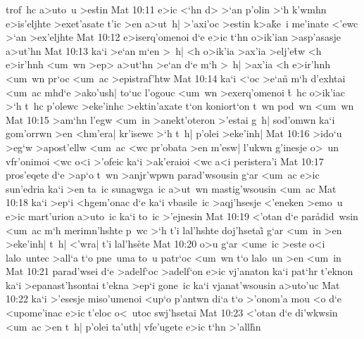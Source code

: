 trof~hc
a>uto~u
>es\r{t}in\bibvsend
{}
\vs Mat 10:11
e>ic
<`hn
d>
>`an
p'olin
>`h
k'wmhn
e>is'eljhte
>exet'asate
t'ic
>en
a>ut~h|
>'axi'oc
>estin
k>a\r{k}e~i
me'inate
<'ewc
>`an
>ex'eljhte\bibvsend
\vs Mat 10:12
e>iserq'omenoi
d`e
e>ic
t`hn
o>ik'ian
>asp'asasje
a>ut'hn\bibvsend
\vs Mat 10:13
ka`i
>e`an
m`en
>~h|
<h
o>ik'ia
>ax'ia
>elj'e\r{t}w
<h
e>ir'hnh
<um~wn
>ep>
a>ut`hn
>e`an
d`e
m`h
>~h|
>ax'ia
<h
e>ir'hnh
<um~wn
pr`oc
<um~ac
>epistraf'htw\bibvsend
\vs Mat 10:14
ka`i
<`oc
>e`a\r{n}
m`h
d'exhtai
<um~ac
mhd`e
>ako'ush|
to`uc
l'ogouc
<um~wn
>exerq'omenoi
\r{t}~hc
o>ik'iac
>`h
t~hc
p'olewc
>eke'inhc
>ektin'axate
t`on
koniort`on
t~wn
pod~wn
<um~wn\bibvsend
\vs Mat 10:15
>am`hn
l'egw
<um~in
>anekt'oteron
>'estai
g~h|
sod'omwn
ka`i
gom'orrwn
>en
<hm'era|
kr'isewc
>`h
t~h|
p'olei
>eke'inh|\bibvsend
\vs Mat 10:16
>ido`u
>eg`w
>apost'ellw
<um~ac
<wc
pr'obata
>en
m'esw|
l'ukwn
g'inesje
o>~un
vfr'onimoi
<wc
o<i
>'ofeic
ka`i
>ak'eraioi
<wc
a<i
peristera'i\bibvsend
\vs Mat 10:17
pros'eqete
d`e
>ap`o
t~wn
>anjr'wpwn
parad'wsousin
g`ar
<um~ac
e>ic
sun'edria
ka`i
>en
ta~ic
sunagwga~ic
a>ut~wn
mastig'wsousin
<um~ac\bibvsend
\vs Mat 10:18
ka`i
>ep`i
<hgem'onac
d`e
ka`i
vbasile~ic
>aqj'hsesje
<'eneken
>emo~u
e>ic
mart'urion
a>uto~ic
ka`i
to~ic
>'ejnesin\bibvsend
\vs Mat 10:19
<'otan
d`e
par\r{a}did~wsin
<um~ac
m`h
merimn'hshte
p~wc
>`h
t'i
lal'hshte
doj'hsetai\r{}
g`ar
<um~in
>en
>eke'inh|
t~h|
<'wra|
t'i
lal'hs\r{e}te\bibvsend
{}
\vs Mat 10:20
o>u
g`ar
<ume~ic
>este
o<i
lalo~untec
>all`a
t`o
pne~uma
to~u
patr`oc
<um~wn
t`o
lalo~un
>en
<um~in\bibvsend
\vs Mat 10:21
parad'wsei
d`e
>adelf`oc
>adelf`on
e>ic
vj'anaton
ka`i
pat`hr
t'eknon
ka`i
>epanast'hsontai
t'ekna
>ep`i
gone~ic
ka`i
vjanat'wsousin
a>uto'uc\bibvsend
\vs Mat 10:22
ka`i
>'esesje
miso'umenoi
<up`o
p'antwn
di`a
t`o
>'onom'a
mou
<o
d`e
<upome'inac
e>ic
t'eloc
o<~utoc
swj'hsetai\bibvsend
\vs Mat 10:23
<'otan
d`e
di'wkwsin
<um~ac
>en
t~h|
p'olei
ta'uth|
vfe'ugete
e>ic
t`hn
>'all\r{h}n
